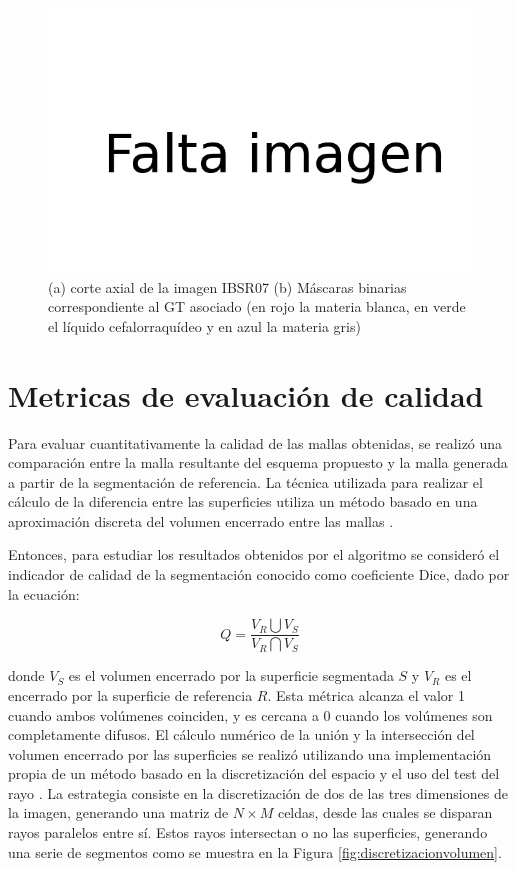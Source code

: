 \begin{figure}[H]
	\centering
	\includegraphics[scale=0.7]{images/FALTA.png}
	\caption{(a) corte axial de la imagen IBSR07 (b) Máscaras binarias correspondiente al GT asociado (en rojo la materia blanca, en verde el líquido cefalorraquídeo y en azul la materia gris)}
	\label{fig:GT}
\end{figure}

\section{Metricas de evaluación de calidad}\label{section:metricas_calidad}
Para evaluar cuantitativamente la calidad de las mallas obtenidas, se realizó una comparación entre la malla resultante del esquema propuesto y la malla generada a partir de la segmentación de referencia. La técnica utilizada para realizar el cálculo de la diferencia entre las superficies utiliza un método basado en una aproximación discreta del volumen encerrado entre las mallas \citep{d2008indicador}.

Entonces, para estudiar los resultados obtenidos por el algoritmo se consideró el indicador de calidad de la segmentación conocido como coeficiente Dice, dado por la ecuación:

$$ Q = \dfrac{V_{R}\bigcup V_{S}}{V_{R}\bigcap V_{S}}$$

donde $V_{S}$ es el volumen encerrado por la superficie segmentada $S$ y $V_{R}$ es el encerrado por la superficie de referencia $R$. Esta métrica alcanza el valor 1 cuando ambos volúmenes coinciden, y es cercana a 0 cuando los volúmenes son completamente difusos. El cálculo numérico de la unión y la intersección del volumen encerrado por las superficies se realizó utilizando una implementación propia de un método basado en la discretización del espacio y el uso del test del rayo \cite{foley1994introduction, d2008indicador}. La estrategia consiste en la discretización de dos de las tres dimensiones de la imagen, generando una matriz de $ N \times M $ celdas, desde las cuales se disparan rayos paralelos entre sí. Estos rayos intersectan o no las superficies, generando una serie de segmentos como se muestra en la Figura \ref{fig:discretizacionvolumen}.

